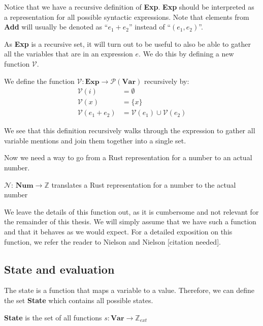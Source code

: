 Notice that we have a recursive definition of \textbf{Exp}. \textbf{Exp} should be interpreted as a representation for all possible syntactic expressions. Note that elements from \textbf{Add} will usually be denoted as ``$e_1 + e_2$'' instead of ``$(e_1, e_2)$''.

As \textbf{Exp} is a recursive set, it will turn out to be useful to also be able to gather all the variables that are in an expression $e$. We do this by defining a new function $\mathcal{V}$.

\begin{definition}
We define the function $\mathcal{V}: \textbf{Exp} \to \mathcal{P}(\textbf{Var})$ recursively by:
\begin{align*}
    \mathcal{V}(i)          &= \emptyset
\\  \mathcal{V}(x)          &= \{ x \}
\\  \mathcal{V}(e_1 + e_2)  &= \mathcal{V}(e_1) \cup \mathcal{V}(e_2)
\end{align*}
\end{definition}

We see that this definition recursively walks through the expression to gather all variable mentions and join them together into a single set. 

Now we need a way to go from a Rust representation for a number to an actual number.

\begin{definition}
$\mathcal{N}$: $\textbf{Num} \to \mathbb{Z}$ translates a Rust representation for a number to the actual number
\end{definition}

We leave the details of this function out, as it is cumbersome and not relevant for the remainder of this thesis. We will simply assume that we have such a function and that it behaves as we would expect. For a detailed exposition on this function, we refer the reader to Nielson and Nielson [citation needed]. 

\subsection*{State and evaluation}
The state is a function that maps a variable to a value. Therefore, we can define the set \textbf{State} which contains all possible states. 

\begin{definition}
\textbf{State} is the set of all functions $s: \textbf{Var} \to \mathbb{Z}_{ext}$
\end{definition}

